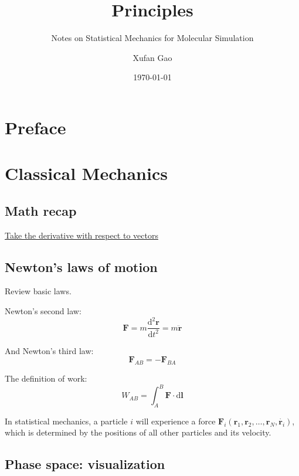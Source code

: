 \documentclass[
  10pt,
  twoside,
  openany,
  b5paper, %
  colorscheme = bootstrap-v4, %
]{qyxf-book}
\title{Principles}
\subtitle{Notes on Statistical Mechanics for Molecular Simulation}  %
\author{Xufan Gao}
\date{\today}
\numberwithin{equation}{section}
\newcommand{\md}{\mathrm{d}}
\newcommand{\dd}[2]{\dfrac{\md^2 #1}{\md #2^2}}
\newcommand{\vF}{\boldsymbol{F}}
\newcommand{\vr}{\boldsymbol{r}}
\newcommand{\vl}{\boldsymbol{l}}
\begin{document}
\maketitle

\chapter*{Preface}



\newpage

\tableofcontents



\chapter{Classical Mechanics}

\section{Math recap}

\href{https://www.cnblogs.com/yanghh/p/13756471.html}{Take the derivative with respect to vectors}

\section{Newton's laws of motion}

Review basic laws.

Newton's second law:
\begin{equation}
	\vF=m\dd{\vr}{t}=m\ddot{\vr} \label{eq:newton2nd}
\end{equation}

And Newton's third law:
\begin{equation}
	\vF_{AB}=-\vF_{BA}
\end{equation}

The definition of work:
\begin{equation}
	W_{AB}=\int_A^B\vF\cdot\md\vl
\end{equation}

In statistical mechanics, a particle $i$ will experience a force $\vF_i(\vr_1, \vr_2,\dots, \vr_N, \dot{\vr_i})$, which is determined by the positions of all other particles and its velocity. 

\section{Phase space: visualization}
\end{document}
